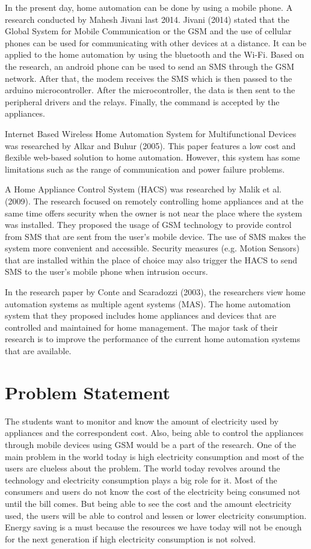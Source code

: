 	In the present day, home automation can be done by using a mobile phone. A research conducted by Mahesh Jivani last 2014. Jivani (2014) stated that the Global System for Mobile Communication or the GSM and the use of cellular phones can be used for communicating with other devices at a distance. It can be applied to the home automation by using the bluetooth and the Wi-Fi. Based on the research, an android phone can be used to send an SMS through the GSM network. After that, the modem receives the SMS which is then passed to the arduino microcontroller. After the microcontroller, the data is then sent to the peripheral drivers and the relays. Finally, the command is accepted by the appliances.

	Internet Based Wireless Home Automation System for Multifunctional Devices was researched by Alkar and Buhur (2005). This paper features a low cost and flexible web-based solution to home automation. However, this system has some limitations such as the range of communication and power failure problems.

	A Home Appliance Control System (HACS) was researched by Malik et al. (2009). The research focused on remotely controlling home appliances and at the same time offers security when the owner is not near the place where the system was installed. They proposed the usage of GSM technology to provide control from SMS that are sent from the user’s mobile device. The use of SMS makes the system more convenient and accessible. Security measures (e.g. Motion Sensors) that are installed within the place of choice may also trigger the HACS to send SMS to the user’s mobile phone when intrusion occurs.
	
	In the research paper by Conte and Scaradozzi (2003), the researchers view home automation systems as multiple agent systems (MAS). The home automation system that they proposed includes home appliances and devices that are controlled and maintained for home management. The major task of their research is to improve the performance of the current home automation systems that are available.


\section{Problem Statement}

	The students want to monitor and know the amount of electricity used by appliances and the correspondent cost. Also, being able to control the appliances through mobile devices using GSM would be a part of the research. One of the main problem in the world today is high electricity consumption and most of the users are clueless about the problem. The world today revolves around the technology and electricity consumption plays a big role for it. Most of the consumers and users do not know the cost of the electricity being consumed not until the bill comes. But being able to see the cost and the amount electricity used, the users will be able to control and lessen or lower electricity consumption. Energy saving is a must because the resources we have today will not be enough for the next generation if high electricity consumption is not solved. 



